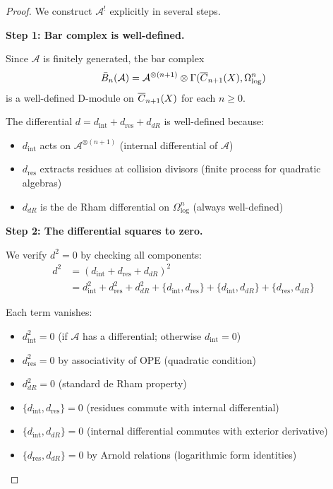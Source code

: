 \begin{proof}
We construct $\mathcal{A}^!$ explicitly in several steps.

\textbf{Step 1: Bar complex is well-defined.}

Since $\mathcal{A}$ is finitely generated, the bar complex
$$\bar{B}_n(\mathcal{A}) = \mathcal{A}^{\otimes (n+1)} \otimes \Gamma(\overline{C}_{n+1}(X), \Omega^n_{\log})$$
is a well-defined D-module on $\overline{C}_{n+1}(X)$ for each $n \geq 0$.

The differential $d = d_{\text{int}} + d_{\text{res}} + d_{dR}$ is well-defined because:
\begin{itemize}
\item $d_{\text{int}}$ acts on $\mathcal{A}^{\otimes (n+1)}$ (internal differential of $\mathcal{A}$)
\item $d_{\text{res}}$ extracts residues at collision divisors (finite process for quadratic algebras)
\item $d_{dR}$ is the de Rham differential on $\Omega^n_{\log}$ (always well-defined)
\end{itemize}

\textbf{Step 2: The differential squares to zero.}

We verify $d^2 = 0$ by checking all components:
\begin{align}
d^2 &= (d_{\text{int}} + d_{\text{res}} + d_{dR})^2 \\
&= d_{\text{int}}^2 + d_{\text{res}}^2 + d_{dR}^2 + \{d_{\text{int}}, d_{\text{res}}\} + \{d_{\text{int}}, d_{dR}\} + \{d_{\text{res}}, d_{dR}\}
\end{align}

Each term vanishes:
\begin{itemize}
\item $d_{\text{int}}^2 = 0$ (if $\mathcal{A}$ has a differential; otherwise $d_{\text{int}} = 0$)
\item $d_{\text{res}}^2 = 0$ by associativity of OPE (quadratic condition)
\item $d_{dR}^2 = 0$ (standard de Rham property)
\item $\{d_{\text{int}}, d_{\text{res}}\} = 0$ (residues commute with internal differential)
\item $\{d_{\text{int}}, d_{dR}\} = 0$ (internal differential commutes with exterior derivative)
\item $\{d_{\text{res}}, d_{dR}\} = 0$ by Arnold relations (logarithmic form identities)
\end{itemize}


\end{proof}

